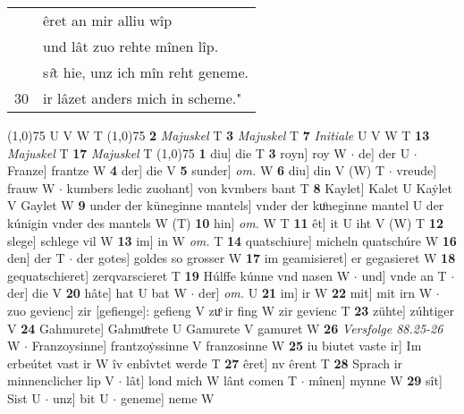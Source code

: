 \documentclass[8pt,a4paper,notitlepage]{article}
\begin{document}
\begin{table}[ht]
\begin{minipage}[t]{0.5\linewidth}
\begin{tabular}{rl}
 & êret an mir alliu wîp\\ 
 & und lât zuo rehte mînen lîp.\\ 
 & s\textit{î}t hie, unz ich mîn reht geneme.\\ 
30 & ir lâzet anders mich in scheme."\\ 
\end{tabular}
\scriptsize
\line(1,0){75} \newline
U V W T \newline
\line(1,0){75} \newline
\textbf{2} \textit{Majuskel} T  \textbf{3} \textit{Majuskel} T  \textbf{7} \textit{Initiale} U V W T  \textbf{13} \textit{Majuskel} T  \textbf{17} \textit{Majuskel} T  \newline
\line(1,0){75} \newline
\textbf{1} diu] die T \textbf{3} royn] roy W  $\cdot$ de] der U  $\cdot$ Franze] frantze W \textbf{4} der] die V \textbf{5} sunder] \textit{om.} W \textbf{6} diu] din V (W) T  $\cdot$ vreude] frauw W  $\cdot$ kumbers ledic zuohant] von kvmbers bant T \textbf{8} Kaylet] Kalet U Kaẏlet V Gaylet W \textbf{9} under der küneginne mantels] vnder der kuͦneginne mantel U der kúnigin vnder des mantels W (T) \textbf{10} hin] \textit{om.} W T \textbf{11} êt] it U iht V (W) T \textbf{12} slege] schlege vil W \textbf{13} im] in W \textit{om.} T \textbf{14} quatschiure] micheln quatschúre W \textbf{16} den] der T  $\cdot$ der gotes] goldes so grosser W \textbf{17} im geamisieret] er gegasieret W \textbf{18} gequatschieret] zerqvarscieret T \textbf{19} Húlffe kúnne vnd nasen W  $\cdot$ und] vnde an T  $\cdot$ der] die V \textbf{20} hâte] hat U bat W  $\cdot$ der] \textit{om.} U \textbf{21} im] ir W \textbf{22} mit] mit irn W  $\cdot$ zuo gevienc] zir [gefienge]: gefieng V zuͦ ir fing W zir gevienc T \textbf{23} zühte] zúhtiger V \textbf{24} Gahmurete] Gahmuͦrete U Gamurete V gamuret W \textbf{26} \textit{Versfolge 88.25-26} W   $\cdot$ Franzoysinne] frantzoẏssinne V franzosinne W \textbf{25} iu biutet vaste ir] Im erbeútet vast ir W îv enbîvtet werde T \textbf{27} êret] nv êrent T \textbf{28} Sprach ir minnenclicher lip V  $\cdot$ lât] lond mich W lânt comen T  $\cdot$ mînen] mynne W \textbf{29} sît] Sist U  $\cdot$ unz] bit U  $\cdot$ geneme] neme W \newline
\end{minipage}
\end{table}
\end{document}
